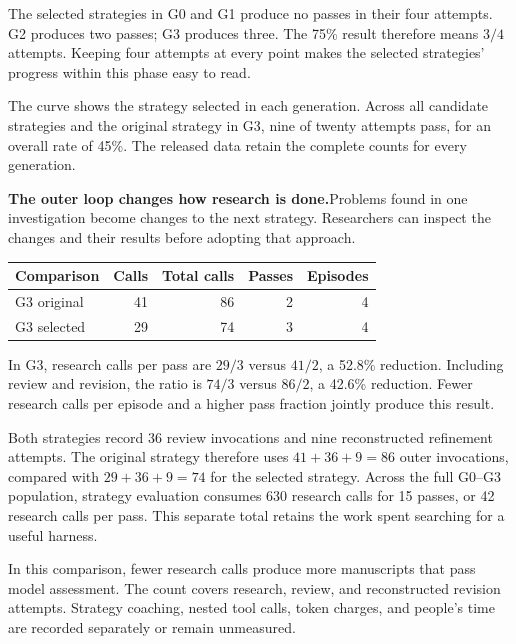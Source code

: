 The selected strategies in G0 and G1 produce no passes in their four attempts. G2 produces two passes; G3 produces three. The 75\% result therefore means $3/4$ attempts. Keeping four attempts at every point makes the selected strategies' progress within this phase easy to read.

The curve shows the strategy selected in each generation. Across all candidate strategies and the original strategy in G3, nine of twenty attempts pass, for an overall rate of 45\%. The released data retain the complete counts for every generation.

\begin{insight}
\textbf{The outer loop changes how research is done.}\quad Problems found in one investigation become changes to the next strategy. Researchers can inspect the changes and their results before adopting that approach.
\end{insight}

\begin{center}\small
\begin{tabularx}{\textwidth}{Yrrrr}
\toprule
\textbf{Comparison} & \textbf{Calls} & \textbf{Total calls} & \textbf{Passes} & \textbf{Episodes}\\
\midrule
G3 original & 41 & 86 & 2 & 4\\
G3 selected & 29 & 74 & 3 & 4\\
\bottomrule
\end{tabularx}
\end{center}
In G3, research calls per pass are $29/3$ versus $41/2$, a 52.8\% reduction. Including review and revision, the ratio is $74/3$ versus $86/2$, a 42.6\% reduction. Fewer research calls per episode and a higher pass fraction jointly produce this result.

Both strategies record 36 review invocations and nine reconstructed refinement attempts. The original strategy therefore uses $41+36+9=86$ outer invocations, compared with $29+36+9=74$ for the selected strategy. Across the full G0--G3 population, strategy evaluation consumes 630 research calls for 15 passes, or 42 research calls per pass. This separate total retains the work spent searching for a useful harness.

In this comparison, fewer research calls produce more manuscripts that pass model assessment. The count covers research, review, and reconstructed revision attempts. Strategy coaching, nested tool calls, token charges, and people's time are recorded separately or remain unmeasured.


